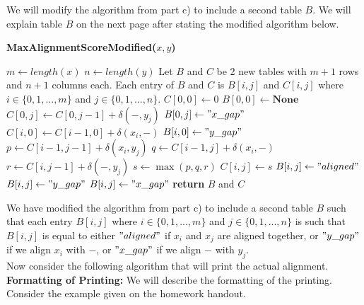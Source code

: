 \documentclass[12pt]{article}
\begin{document}
We will modify the algorithm from part c) to include a second table $B$. We will explain table $B$ on the next page after stating the modified algorithm below.
\begin{algorithm}[hbt!]
\caption{\textbf{MaxAlignmentScoreModified($x,y$)}}\label{alg:cap}

\begin{algorithmic}[1]
\State $m \gets length(x)$ 
\State $n \gets length(y)$
\State
\State Let $B$ and $C$ be 2 new tables with $m+1$ rows and $n+1$ columns each. Each entry of $B$ and $C$ is $B[i,j]$ and $C[i,j]$ where $i \in \{0,1,...,m\}$ and $j \in \{0,1,...,n\}$. 
\State
\State $C[0,0] \gets 0$ 
\State $B[0,0] \gets \textbf{None}$
\State
{} 
    \State $C[0,j] \gets C[0,j-1] + \delta(-,y_j)$
    \State $B[0,j] \gets "x\_gap"$
\EndFor
\State
{} 
    \State $C[i,0] \gets C[i-1,0] + \delta(x_i,-)$
    \State $B[i,0] \gets "y\_gap"$
\EndFor
\State
{} 
        \State $p \gets C[i-1,j-1] + \delta(x_i,y_j)$
        \State $q \gets C[i-1,j] + \delta(x_i,-)$
        \State $r \gets C[i,j-1] + \delta(-,y_j)$
        \State $s \gets \max(p,q,r)$
        \State $C[i,j] \gets s$
        \State
            \State $B[i,j] \gets "aligned"$
            \State $B[i,j] \gets "y\_gap"$
            \State $B[i,j] \gets "x\_gap"$
        \EndIf
    \EndFor
\EndFor
\State
\State \textbf{return} $B$ and $C$ 
\end{algorithmic}
\end{algorithm}


We have modified the algorithm from part c) to include a second table $B$ such that each entry $B[i,j]$ where $i \in \{0,1,...,m\}$ and $j \in \{0,1,...,n\}$ is such that $B[i,j]$ is equal to either $"aligned"$ if $x_i$ and $x_j$ are aligned together, or $"y\_gap"$ if we align $x_i$ with $-$, or $"x\_gap"$ if we align $-$ with $y_j$. \\

Now consider the following algorithm that will print the actual alignment. \\

\textbf{Formatting of Printing:} We will describe the formatting of the printing. Consider the example given on the homework handout. 
\end{document}
